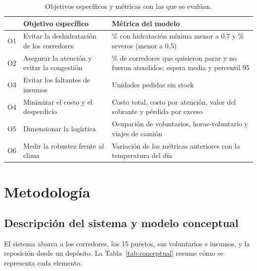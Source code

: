 \documentclass[11pt,a4paper]{article}
\begin{document}
\begin{table}[H]
\centering
\small
\begin{tabular}{lP{6cm}P{7cm}}
\toprule
& \textbf{Objetivo específico} & \textbf{Métrica del modelo} \\
\midrule
O1 & Evitar la deshidratación de los corredores & \% con hidratación mínima menor a 0,7 y \% severos (menor a 0,5) \\
O2 & Asegurar la atención y evitar la congestión & \% de corredores que quisieron parar y no fueron atendidos; espera media y percentil 95 \\
O3 & Evitar los faltantes de insumos & Unidades pedidas sin stock \\
O4 & Minimizar el costo y el desperdicio & Costo total, costo por atención, valor del sobrante y pérdida por exceso \\
O5 & Dimensionar la logística & Ocupación de voluntarios, horas-voluntario y viajes de camión \\
O6 & Medir la robustez frente al clima & Variación de las métricas anteriores con la temperatura del día \\
\bottomrule
\end{tabular}
\caption{Objetivos específicos y métricas con las que se evalúan.}
\end{table}

\section{Metodología}

\subsection{Descripción del sistema y modelo conceptual}

El sistema abarca a los corredores, los 15 puestos, sus voluntarios e insumos, y la reposición desde un depósito. La Tabla~\ref{tab:conceptual} resume cómo se representa cada elemento.
\end{document}

